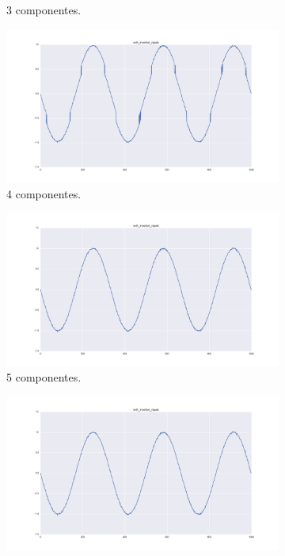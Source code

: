 \documentclass[11pt,spanish,listoffigures,listoftables]{tfgetsinf}
\begin{document}
\begin{figure}[H]
\begin{subfigure}[h]{0.33\textwidth}
                \caption{3 componentes.}
                \label{fig:col5_inverted_nipals3}
            \end{subfigure}
            \begin{subfigure}[h]{0.33\textwidth}
                \centering
                \includegraphics[width=\textwidth]{simulated_data_8_columns/col5_inverted_nipals_4.png}
                \caption{4 componentes.}
                \label{fig:col5_inverted_nipals4}
            \end{subfigure}
            \begin{subfigure}[h]{0.33\textwidth}
                \centering
                \includegraphics[width=\textwidth]{simulated_data_8_columns/col5_inverted_nipals_5.png}
                \caption{5 componentes.}
                \label{fig:col5_inverted_nipals5}
            \end{subfigure}
            \begin{subfigure}[h]{0.33\textwidth}
                \centering
                \includegraphics[width=\textwidth]{simulated_data_8_columns/col5_inverted_nipals_6.png}

\end{subfigure}
\end{figure}
\end{document}
